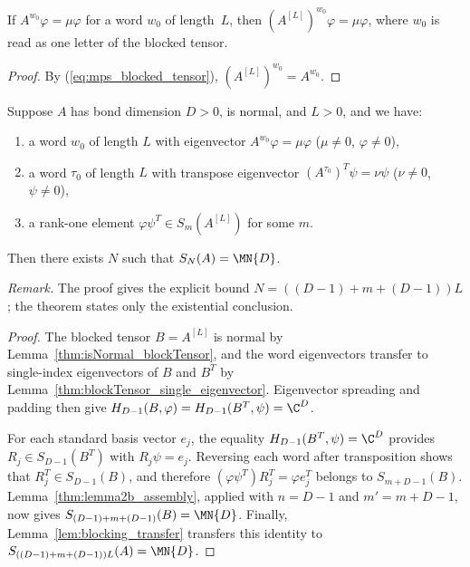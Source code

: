 \begin{lemma}%
    \label{thm:blockTensor_single_eigenvector}
    \leanok
    If $A^{w_0}\varphi=\mu\varphi$ for a word $w_0$
    of length~$L$, then $(A^{[L]})^{w_0}\varphi=\mu\varphi$,
    where $w_0$ is read as one letter of the blocked tensor.
\end{lemma}

\begin{proof}\leanok
    By (\ref{eq:mps_blocked_tensor}),
    $(A^{[L]})^{w_0}=A^{w_0}$.
\end{proof}

\begin{lemma}\label{thm:wielandt_blocked_assembly}
    \leanok
    Suppose $A$ has bond dimension $D>0$, is normal, and $L>0$, and we have:
    \begin{enumerate}
        \item a word $w_0$ of length $L$ with eigenvector
              $A^{w_0}\varphi=\mu\varphi$
              ($\mu\neq0$, $\varphi\neq0$),
        \item a word $\tau_0$ of length $L$ with transpose
              eigenvector
              $(A^{\tau_0})^T\psi=\nu\psi$
              ($\nu\neq0$, $\psi\neq0$),
        \item a rank-one element
              $\varphi\psi^T\in S_m(A^{[L]})$
              for some $m$.
    \end{enumerate}
    Then there exists $N$ such that $S_N(A)=\MN{D}$.

    \noindent\emph{Remark.}
    The proof gives the explicit bound
    $N=((D{-}1)+m+(D{-}1))L$; the theorem states only the
    existential conclusion.
\end{lemma}

\begin{proof}
    \leanok
    The blocked tensor $B=A^{[L]}$ is normal by
    Lemma~\ref{thm:isNormal_blockTensor}, and the word eigenvectors transfer
    to single-index eigenvectors of $B$ and $B^T$ by
    Lemma~\ref{thm:blockTensor_single_eigenvector}. Eigenvector spreading
    and padding then give
    $H_{D-1}(B,\varphi)=H_{D-1}(B^T,\psi)=\C^D$.

    For each standard basis vector $e_j$, the equality
    $H_{D-1}(B^T,\psi)=\C^D$ provides
    $R_j\in S_{D-1}(B^T)$ with $R_j\psi=e_j$. Reversing each word after
    transposition shows that $R_j^T\in S_{D-1}(B)$, and therefore
    $(\varphi\psi^T)R_j^T=\varphi e_j^T$ belongs to
    $S_{m+D-1}(B)$. Lemma~\ref{thm:lemma2b_assembly}, applied with
    $n=D-1$ and $m'=m+D-1$, now gives
    $S_{(D-1)+m+(D-1)}(B)=\MN{D}$. Finally,
    Lemma~\ref{lem:blocking_transfer} transfers this identity to
    $S_{((D-1)+m+(D-1))L}(A)=\MN{D}$.
\end{proof}

